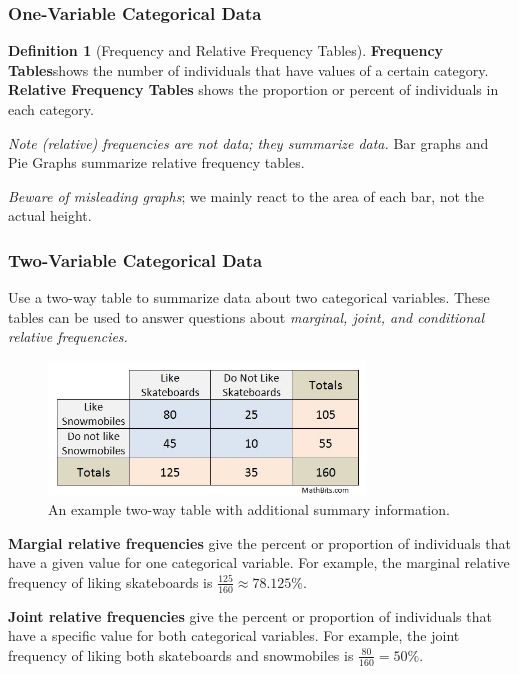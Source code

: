 \documentclass[12pt, a4paper]{article}
\theoremstyle{definition}
\newtheorem{definition}{Definition}
\begin{document}
\subsubsection{One-Variable Categorical Data}
\begin{definition}[Frequency and Relative Frequency Tables]
    \textbf{Frequency Tables}shows the number of individuals that have values of a certain category. \textbf{Relative Frequency Tables} shows the proportion or percent of individuals in each category.
\end{definition}

\emph{Note (relative) frequencies are not data; they \emph{summarize} data.} Bar graphs and Pie Graphs summarize relative frequency tables.

\emph{Beware of misleading graphs}; we mainly react to the area of each bar, not the actual height.

\subsubsection{Two-Variable Categorical Data}
Use a two-way table to summarize data about two categorical variables. These tables can be used to answer questions about \emph{marginal, joint, and conditional relative frequencies.}
\begin{figure}[t]
    \centering
    \includegraphics[width=0.75\textwidth]{two way table.png}
    \caption{An example two-way table with additional summary information.}
    \label{fig:two-way-table}
\end{figure}

\textbf{Margial relative frequencies} give the percent or proportion of individuals that have a given value for one categorical variable. For example, the marginal relative frequency of liking skateboards is $\frac{125}{160} \approx 78.125\%$.

\textbf{Joint relative frequencies} give the percent or proportion of individuals that have a specific value for both categorical variables. For example, the joint frequency of liking both skateboards and snowmobiles is $\frac{80}{160} = 50\%$.
\end{document}
